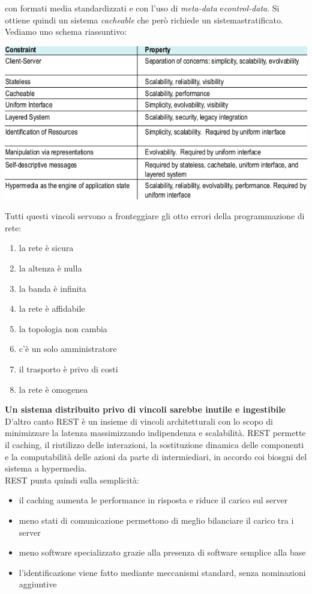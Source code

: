 \documentclass[a4paper,12pt, oneside]{book}
\begin{document}
con formati media standardizzati e con l'uso di \textit{meta-data} e\textit{control-data}. Si ottiene quindi un sistema \textit{cacheable} che però richiede un
sistemastratificato.
\newpage
Vediamo uno schema riassuntivo:
\begin{center}
\includegraphics[scale=0.7]{img/cont.png}
\end{center}
Tutti questi vincoli servono a fronteggiare gli otto errori della programmazione di rete:
\begin{enumerate}
\item la rete è sicura
\item la altenza è nulla
\item la banda è infinita
\item la rete è affidabile
\item la topologia non cambia
\item c'è un solo amministratore
\item il trasporto è privo di costi
\item la rete è omogenea
\end{enumerate}
\textbf{Un sistema distribuito privo di vincoli sarebbe inutile e ingestibile}\\
D'altro canto REST è un insieme di vincoli architetturali con lo scopo di minimizzare la latenza massimizzando indipendenza e scalabilità.
REST permette il caching, il riutilizzo delle interazioni, la sostituzione dinamica delle componenti e la computabilità delle azioni da parte di intermiediari,
in accordo coi biosgni del sistema a hypermedia.\\
REST punta quindi sulla semplicità:
\begin{itemize}
\item il caching aumenta le performance in risposta e riduce il carico sul server
\item meno stati di comunicazione permettono di meglio bilanciare il carico tra i server
\item meno software specializzato grazie alla presenza di software semplice alla base
\item l'identificazione viene fatto mediante meccanismi standard, senza nominazioni aggiuntive
\end{itemize}
\end{document}
